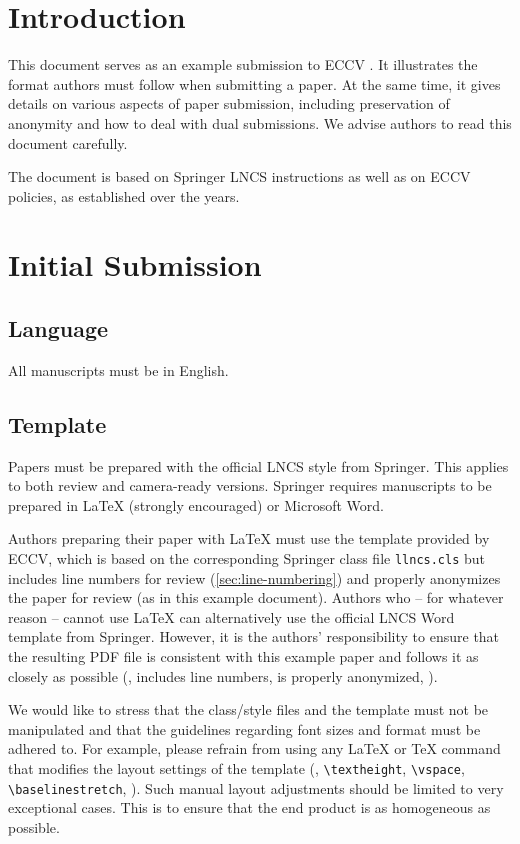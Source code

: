 \documentclass[runningheads]{llncs}
\begin{document}
\section{Introduction}
\label{sec:intro}

This document serves as an example submission to ECCV \ECCVyear{}.
It illustrates the format authors must follow when submitting a paper. 
At the same time, it gives details on various aspects of paper submission, including preservation of anonymity and how to deal with dual submissions.
We advise authors to read this document carefully.

The document is based on Springer LNCS instructions as well as on ECCV policies, as established over the years.

\section{Initial Submission}

\subsection{Language}
All manuscripts must be in English.


\subsection{Template}
Papers must be prepared with the official LNCS style from Springer.
This applies to both review and camera-ready versions.
Springer requires manuscripts to be prepared in \LaTeX{} (strongly encouraged) or Microsoft Word. 

Authors preparing their paper with \LaTeX{} must use the template provided by ECCV, which is based on the corresponding Springer class file \texttt{llncs.cls} but includes line numbers for review (\cref{sec:line-numbering}) and properly anonymizes the paper for review (as in this example document).
Authors who -- for whatever reason -- cannot use \LaTeX{} can alternatively use the official LNCS Word template from Springer.
However, it is the authors' responsibility to ensure that the resulting PDF file is consistent with this example paper and follows it as closely as possible (\ie, includes line numbers, is properly anonymized, \etc).

We would like to stress that the class/style files and the template must not be manipulated and that the guidelines regarding font sizes and format must be adhered to. 
For example, please refrain from using any \LaTeX{} or \TeX{} command that modifies the layout settings of the template (\eg, \verb+\textheight+, \verb+\vspace+, \verb+\baselinestretch+, \etc).
Such manual layout adjustments should be limited to very exceptional cases.
This is to ensure that the end product is as homogeneous as possible.
\end{document}
